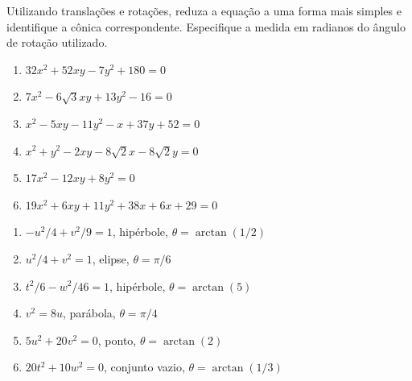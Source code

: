 \documentclass[12pt]{exam}
\begin{document}
\begin{exercicio}
    Utilizando translações e rotações, reduza a equação a uma forma mais simples e identifique a cônica correspondente. Especifique a medida em radianos do ângulo de rotação utilizado.
    \begin{enumerate}[label=({\alph*})]
        \item $32x^2 + 52xy - 7y^2 + 180 = 0$
        \item $7x^2 - 6\sqrt{3}xy + 13y^2 - 16 = 0$
        \item $x^2 - 5xy - 11y^2 - x + 37y + 52 = 0$
        \item $x^2 + y^2 - 2xy -8\sqrt{2}x - 8\sqrt{2}y = 0$
        \item $17x^2 - 12xy + 8y^2 = 0$
        \item $19x^2 + 6xy + 11y^2 + 38x + 6x + 29 = 0$
    \end{enumerate}
    \begin{solucao}
        \begin{enumerate}[label=({\alph*})]
            \item $-u^2/4 + v^2/9 = 1$, hipérbole, $\theta = \arctan(1/2)$
            \item $u^2/4 + v^2 = 1$, elipse, $\theta = \pi/6$
            \item $t^2/6 - w^2/46 = 1$, hipérbole, $\theta = \arctan(5)$
            \item $v^2 = 8u$, parábola, $\theta = \pi/4$
            \item $5u^2 + 20v^2 = 0$, ponto, $\theta = \arctan(2)$
            \item $20t^2 + 10w^2 = 0$, conjunto vazio, $\theta = \arctan(1/3)$
        \end{enumerate}
    \end{solucao}
\end{exercicio}
\end{document}
